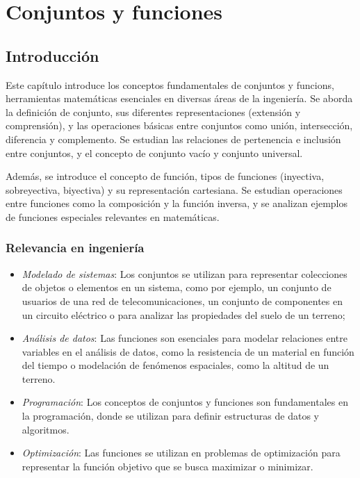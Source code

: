 \chapter{Conjuntos y funciones}

\section*{Introducción}

Este capítulo introduce los conceptos fundamentales de \glspl{conjunto} y \glspl{funcion}, herramientas matemáticas esenciales en diversas áreas de la ingeniería. Se aborda la definición de conjunto, sus diferentes representaciones (extensión y comprensión), y las operaciones básicas entre conjuntos como unión, intersección, diferencia y complemento. Se estudian las relaciones de pertenencia e inclusión entre conjuntos, y el concepto de conjunto vacío y conjunto universal.

Además, se introduce el concepto de función, tipos de funciones (inyectiva, sobreyectiva, biyectiva) y su representación cartesiana. Se estudian operaciones entre funciones como la composición y la función inversa, y se analizan ejemplos de funciones especiales relevantes en matemáticas.


\subsection*{Relevancia en ingeniería}

\begin{itemize}
	\item \textit{Modelado de sistemas}: Los conjuntos se utilizan para representar colecciones de objetos o elementos en un sistema, como por ejemplo, un conjunto de usuarios de una red de telecomunicaciones, un conjunto de componentes en un circuito eléctrico o para analizar las propiedades del suelo de un terreno;
	\item \textit{Análisis de datos}: Las funciones son esenciales para modelar relaciones entre variables en el análisis de datos, como la resistencia de un material en función del tiempo o modelación de fenómenos espaciales, como la altitud de un terreno.
	\item \textit{Programación}: Los conceptos de conjuntos y funciones son fundamentales en la programación, donde se utilizan para definir estructuras de datos y algoritmos.
	\item \textit{Optimización}: Las funciones se utilizan en problemas de optimización para representar la función objetivo que se busca maximizar o minimizar.
\end{itemize}

